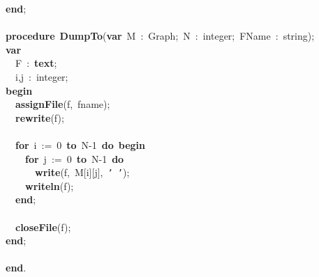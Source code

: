 \mbox{}\textbf{end}; \\
\mbox{} \\
\mbox{}\textbf{procedure}\ \textbf{DumpTo}(\textbf{var}\ M\ :\ Graph;\ N\ :\ integer;\ FName\ :\ string); \\
\mbox{}\textbf{var} \\
\mbox{}\ \ F\ :\ \textbf{text}; \\
\mbox{}\ \ i,j\ :\ integer; \\
\mbox{}\textbf{begin} \\
\mbox{}\ \ \textbf{assignFile}(f,\ fname); \\
\mbox{}\ \ \textbf{rewrite}(f); \\
\mbox{} \\
\mbox{}\ \ \textbf{for}\ i\ :=\ 0\ \textbf{to}\ N-1\ \textbf{do}\ \textbf{begin} \\
\mbox{}\ \ \ \ \textbf{for}\ j\ :=\ 0\ \textbf{to}\ N-1\ \textbf{do} \\
\mbox{}\ \ \ \ \ \ \textbf{write}(f,\ M[i][j],\ \texttt{'\ '}); \\
\mbox{}\ \ \ \ \textbf{writeln}(f); \\
\mbox{}\ \ \textbf{end}; \\
\mbox{} \\
\mbox{}\ \ \textbf{closeFile}(f); \\
\mbox{}\textbf{end}; \\
\mbox{} \\
\mbox{}\textbf{end}. \\
\mbox{} \\
\mbox{}
